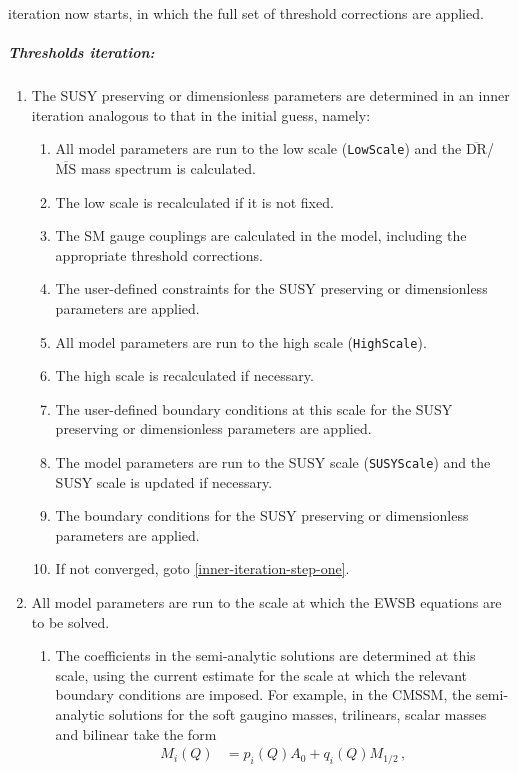 \documentclass[final,3p,11pt,pdflatex]{elsarticle}
\newcommand{\code}[1]{\lstinline|#1|}  %
\newcommand{\ol}[1]{\overline{#1}}
\newcommand{\MSbar}{\ensuremath{\ol{\text{MS}}}\xspace}
\newcommand{\DRbar}{\ensuremath{\ol{\text{DR}}}\xspace}
\newcommand{\azero}{\ensuremath{A_0}\xspace}
\newcommand{\mhalf}{\ensuremath{M_{1/2}}\xspace}
\begin{document}
iteration now starts, in which the full set of threshold corrections are
applied.
%
\subparagraph{Thresholds iteration:}
%
\begin{enumerate}
\item \label{outer-iteration-step-one} The SUSY preserving or dimensionless
  parameters are determined in an inner iteration analogous to that in the
  initial guess, namely:
  \begin{enumerate}
  \item \label{inner-iteration-step-one} All model parameters are run to the
    low scale (\code{LowScale}) and the \DRbar/\MSbar mass spectrum is
    calculated.
  \item The low scale is recalculated if it is not fixed.
  \item The SM gauge couplings are calculated in the model, including the
    appropriate threshold corrections.
  \item The user-defined constraints for the SUSY preserving or dimensionless
    parameters are applied.
  \item All model parameters are run to the high scale (\code{HighScale}).
  \item The high scale is recalculated if necessary.
  \item The user-defined boundary conditions at this scale for the
    SUSY preserving or dimensionless parameters are applied.
  \item The model parameters are run to the SUSY scale (\code{SUSYScale})
    and the SUSY scale is updated if necessary.
  \item The boundary conditions for the SUSY preserving or dimensionless
    parameters are applied.
  \item If not converged, goto \ref{inner-iteration-step-one}.
  \end{enumerate}
\item All model parameters are run to the scale at which the EWSB equations
  are to be solved.
  \begin{enumerate}
  \item The coefficients in the semi-analytic solutions are determined
    at this scale, using the current estimate for the scale at which the
    relevant boundary conditions are imposed.  For example, in the CMSSM, the
    semi-analytic solutions for the soft gaugino masses, trilinears, scalar
    masses and bilinear take the form
    \begin{equation}
      \begin{aligned}
        M_i(Q) &= p_i(Q) \azero + q_i(Q) \mhalf \, , \\

\end{aligned}
\end{equation}
\end{enumerate}
\end{enumerate}
\end{document}
